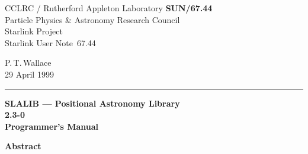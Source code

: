 \documentclass[11pt,twoside]{article}
\newcommand{\stardoccategory}  {Starlink User Note}
\newcommand{\stardocinitials}  {SUN}
\newcommand{\stardocnumber}    {67.44}
\newcommand{\stardocauthors}   {P.\,T.\,Wallace}
\newcommand{\stardocdate}      {29 April 1999}
\newcommand{\stardoctitle}     {SLALIB --- Positional Astronomy Library}
\newcommand{\stardocversion}   {2.3-0}
\newcommand{\stardocmanual}    {Programmer's Manual}
\newcommand{\stardocname}{\stardocinitials /\stardocnumber}
\newenvironment{latexonly}{}{}
\begin{document}
\thispagestyle{empty}

\begin{latexonly}
   CCLRC / {\sc Rutherford Appleton Laboratory} \hfill {\bf \stardocname}\\
   {\large Particle Physics \& Astronomy Research Council}\\
   {\large Starlink Project\\}
   {\large \stardoccategory\ \stardocnumber}
   \begin{flushright}
   \stardocauthors\\
   \stardocdate
   \end{flushright}
   \vspace{-4mm}
   \rule{\textwidth}{0.5mm}
   \vspace{5mm}
   \begin{center}
   {\Huge\bf  \stardoctitle \\ [2.5ex]}
   {\LARGE\bf \stardocversion \\ [4ex]}
   {\Huge\bf  \stardocmanual}
   \end{center}
   \vspace{5mm}

   \vspace{10mm}
   \begin{center}
      {\Large\bf Abstract}
   \end{center}
\end{latexonly}
\end{document}
